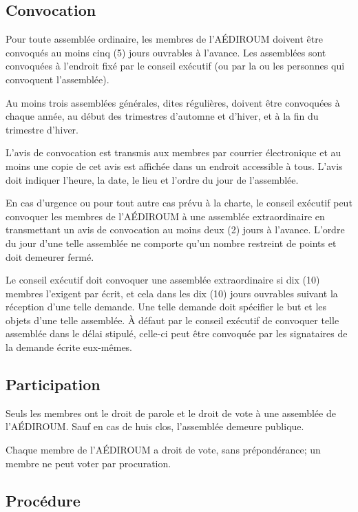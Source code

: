 \documentclass[12pt]{article}
\begin{document}
\subsection{Convocation}

Pour toute assemblée ordinaire, les membres de l'AÉDIROUM doivent être convoqués au moins cinq (5) jours ouvrables à l'avance. Les assemblées sont convoquées à l'endroit fixé par le conseil exécutif (ou par la ou les personnes qui convoquent l'assemblée).

Au moins trois assemblées générales, dites régulières, doivent être convoquées à chaque année, au début des trimestres d'automne et d'hiver, et à la fin du trimestre d'hiver.

L'avis de convocation est transmis aux membres par courrier électronique et au moins une copie de cet avis est affichée dans un endroit accessible à tous. L'avis doit indiquer l'heure, la date, le lieu et l'ordre du jour de l'assemblée.

En cas d'urgence ou pour tout autre cas prévu à la charte, le conseil exécutif peut convoquer les membres de l'AÉDIROUM à une assemblée extraordinaire en transmettant un avis de convocation au moins deux (2) jours à l'avance. L'ordre du jour d'une telle assemblée ne comporte qu'un nombre restreint de points et doit demeurer fermé.

Le conseil exécutif doit convoquer une assemblée extraordinaire si dix (10) membres l'exigent par écrit, et cela dans les dix (10) jours ouvrables suivant la réception d'une telle demande. Une telle demande doit spécifier le but et les objets d'une telle assemblée. À défaut par le conseil exécutif de convoquer telle assemblée dans le délai stipulé, celle-ci peut être convoquée par les signataires de la demande écrite eux-mêmes.

\subsection{Participation}

Seuls les membres ont le droit de parole et le droit de vote à une assemblée de l'AÉDIROUM. Sauf en cas de huis clos, l'assemblée demeure publique.

Chaque membre de l'AÉDIROUM a droit de vote, sans prépondérance; un membre ne peut voter par procuration.

\subsection{Procédure}
\end{document}
